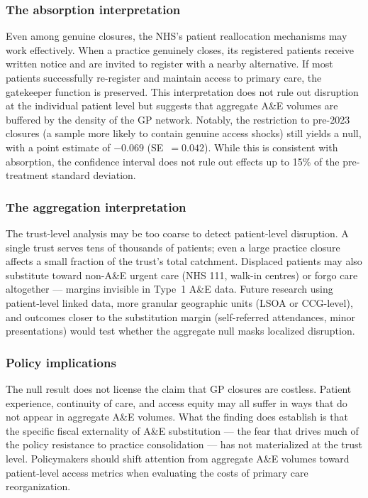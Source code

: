 \documentclass[12pt]{article}
\begin{document}
\subsubsection*{The absorption interpretation} Even among genuine closures, the NHS's patient reallocation mechanisms may work effectively. When a practice genuinely closes, its registered patients receive written notice and are invited to register with a nearby alternative. If most patients successfully re-register and maintain access to primary care, the gatekeeper function is preserved. This interpretation does not rule out disruption at the individual patient level but suggests that aggregate A\&E volumes are buffered by the density of the GP network. Notably, the restriction to pre-2023 closures (a sample more likely to contain genuine access shocks) still yields a null, with a point estimate of $-0.069$ (SE~$= 0.042$). While this is consistent with absorption, the confidence interval does not rule out effects up to 15\% of the pre-treatment standard deviation.

\subsubsection*{The aggregation interpretation} The trust-level analysis may be too coarse to detect patient-level disruption. A single trust serves tens of thousands of patients; even a large practice closure affects a small fraction of the trust's total catchment. Displaced patients may also substitute toward non-A\&E urgent care (NHS 111, walk-in centres) or forgo care altogether --- margins invisible in Type~1 A\&E data. Future research using patient-level linked data, more granular geographic units (LSOA or CCG-level), and outcomes closer to the substitution margin (self-referred attendances, minor presentations) would test whether the aggregate null masks localized disruption.

\subsubsection*{Policy implications} The null result does not license the claim that GP closures are costless. Patient experience, continuity of care, and access equity may all suffer in ways that do not appear in aggregate A\&E volumes. What the finding does establish is that the specific fiscal externality of A\&E substitution --- the fear that drives much of the policy resistance to practice consolidation --- has not materialized at the trust level. Policymakers should shift attention from aggregate A\&E volumes toward patient-level access metrics when evaluating the costs of primary care reorganization.
\end{document}
